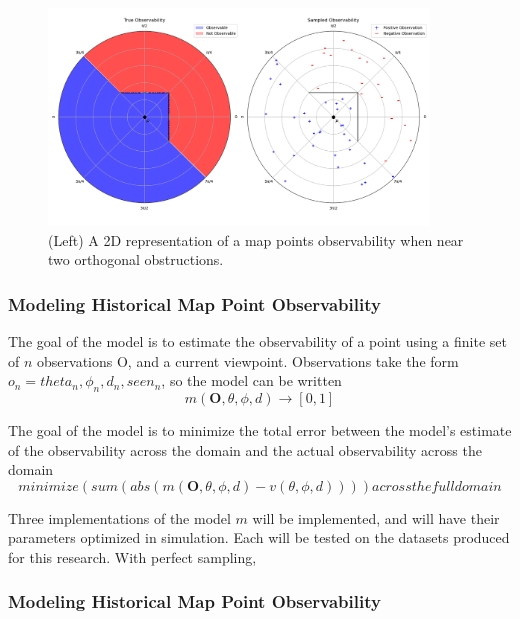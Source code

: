 \begin{figure}[!ht]
    \centering
    \includegraphics[width=0.9\textwidth]{resources/2d_observability.png}
    \caption[2D Observability]{(Left) A 2D representation of a map points observability when near two orthogonal obstructions. }
    \label{fig:2d_observability}
\end{figure}

\subsubsection{Modeling Historical Map Point Observability}

The goal of the model is to estimate the observability of a point using a finite set of $n$ observations O, and a current viewpoint. Observations take the form $o_n={theta_n,\phi_n,d_n,seen_n}$, so the model can be written
$$
    m(\boldsymbol{O},\theta,\phi,d)\to[0,1]
$$

The goal of the model is to minimize the total error between the model's estimate of the observability across the domain and the actual observability across the domain
$$
    minimize(sum(abs(m(\boldsymbol{O},\theta,\phi,d)-v(\theta,\phi,d)))) across the full domain
$$

Three implementations of the model $m$ will be implemented, and will have their parameters optimized in simulation. Each will be tested on the datasets produced for this research. With perfect sampling,

\subsubsection{Modeling Historical Map Point Observability}
\label{sec:observability_models}

